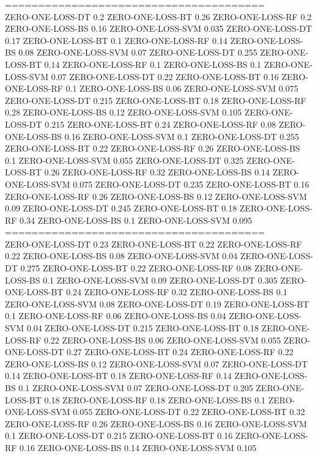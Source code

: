 \documentclass[12pt]{article}
\begin{document}
=======================================\\
ZERO-ONE-LOSS-DT 0.2
ZERO-ONE-LOSS-BT 0.26
ZERO-ONE-LOSS-RF 0.2
ZERO-ONE-LOSS-BS 0.16
ZERO-ONE-LOSS-SVM 0.035
ZERO-ONE-LOSS-DT 0.17
ZERO-ONE-LOSS-BT 0.1
ZERO-ONE-LOSS-RF 0.14
ZERO-ONE-LOSS-BS 0.08
ZERO-ONE-LOSS-SVM 0.07
ZERO-ONE-LOSS-DT 0.255
ZERO-ONE-LOSS-BT 0.14
ZERO-ONE-LOSS-RF 0.1
ZERO-ONE-LOSS-BS 0.1
ZERO-ONE-LOSS-SVM 0.07
ZERO-ONE-LOSS-DT 0.22
ZERO-ONE-LOSS-BT 0.16
ZERO-ONE-LOSS-RF 0.1
ZERO-ONE-LOSS-BS 0.06
ZERO-ONE-LOSS-SVM 0.075
ZERO-ONE-LOSS-DT 0.215
ZERO-ONE-LOSS-BT 0.18
ZERO-ONE-LOSS-RF 0.28
ZERO-ONE-LOSS-BS 0.12
ZERO-ONE-LOSS-SVM 0.105
ZERO-ONE-LOSS-DT 0.215
ZERO-ONE-LOSS-BT 0.24
ZERO-ONE-LOSS-RF 0.08
ZERO-ONE-LOSS-BS 0.16
ZERO-ONE-LOSS-SVM 0.1
ZERO-ONE-LOSS-DT 0.255
ZERO-ONE-LOSS-BT 0.22
ZERO-ONE-LOSS-RF 0.26
ZERO-ONE-LOSS-BS 0.1
ZERO-ONE-LOSS-SVM 0.055
ZERO-ONE-LOSS-DT 0.325
ZERO-ONE-LOSS-BT 0.26
ZERO-ONE-LOSS-RF 0.32
ZERO-ONE-LOSS-BS 0.14
ZERO-ONE-LOSS-SVM 0.075
ZERO-ONE-LOSS-DT 0.235
ZERO-ONE-LOSS-BT 0.16
ZERO-ONE-LOSS-RF 0.26
ZERO-ONE-LOSS-BS 0.12
ZERO-ONE-LOSS-SVM 0.09
ZERO-ONE-LOSS-DT 0.245
ZERO-ONE-LOSS-BT 0.18
ZERO-ONE-LOSS-RF 0.34
ZERO-ONE-LOSS-BS 0.1
ZERO-ONE-LOSS-SVM 0.095\\
=======================================\\
ZERO-ONE-LOSS-DT 0.23
ZERO-ONE-LOSS-BT 0.22
ZERO-ONE-LOSS-RF 0.22
ZERO-ONE-LOSS-BS 0.08
ZERO-ONE-LOSS-SVM 0.04
ZERO-ONE-LOSS-DT 0.275
ZERO-ONE-LOSS-BT 0.22
ZERO-ONE-LOSS-RF 0.08
ZERO-ONE-LOSS-BS 0.1
ZERO-ONE-LOSS-SVM 0.09
ZERO-ONE-LOSS-DT 0.305
ZERO-ONE-LOSS-BT 0.24
ZERO-ONE-LOSS-RF 0.32
ZERO-ONE-LOSS-BS 0.1
ZERO-ONE-LOSS-SVM 0.08
ZERO-ONE-LOSS-DT 0.19
ZERO-ONE-LOSS-BT 0.1
ZERO-ONE-LOSS-RF 0.06
ZERO-ONE-LOSS-BS 0.04
ZERO-ONE-LOSS-SVM 0.04
ZERO-ONE-LOSS-DT 0.215
ZERO-ONE-LOSS-BT 0.18
ZERO-ONE-LOSS-RF 0.22
ZERO-ONE-LOSS-BS 0.06
ZERO-ONE-LOSS-SVM 0.055
ZERO-ONE-LOSS-DT 0.27
ZERO-ONE-LOSS-BT 0.24
ZERO-ONE-LOSS-RF 0.22
ZERO-ONE-LOSS-BS 0.12
ZERO-ONE-LOSS-SVM 0.07
ZERO-ONE-LOSS-DT 0.14
ZERO-ONE-LOSS-BT 0.18
ZERO-ONE-LOSS-RF 0.14
ZERO-ONE-LOSS-BS 0.1
ZERO-ONE-LOSS-SVM 0.07
ZERO-ONE-LOSS-DT 0.205
ZERO-ONE-LOSS-BT 0.18
ZERO-ONE-LOSS-RF 0.18
ZERO-ONE-LOSS-BS 0.1
ZERO-ONE-LOSS-SVM 0.055
ZERO-ONE-LOSS-DT 0.22
ZERO-ONE-LOSS-BT 0.32
ZERO-ONE-LOSS-RF 0.26
ZERO-ONE-LOSS-BS 0.16
ZERO-ONE-LOSS-SVM 0.1
ZERO-ONE-LOSS-DT 0.215
ZERO-ONE-LOSS-BT 0.16
ZERO-ONE-LOSS-RF 0.16
ZERO-ONE-LOSS-BS 0.14
ZERO-ONE-LOSS-SVM 0.105\\
\end{document}
